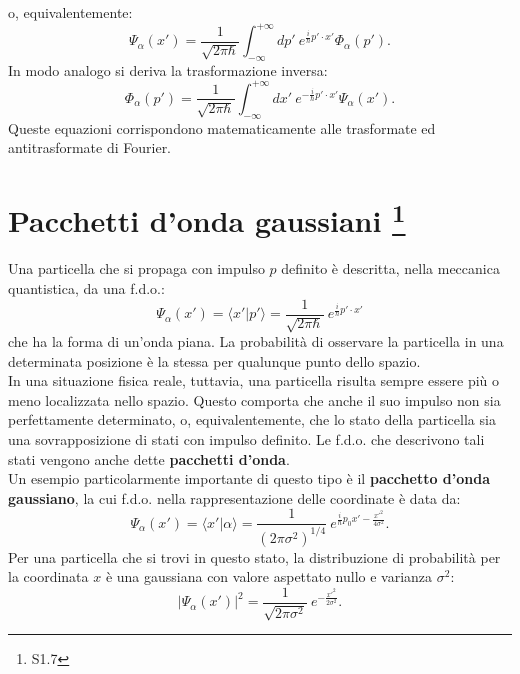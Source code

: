 \documentclass[a4paper,12pt,oneside]{book}
\begin{document}
o, equivalentemente:
\begin{equation}
\Psi_\alpha (x') = \frac{1}{\sqrt{2 \pi \hbar}} \int_{-\infty}^{+\infty} dp' ~ e^{\frac{i}{\hbar}p' \cdot x'} \Phi_\alpha (p').
\end{equation}
In modo analogo si deriva la trasformazione inversa:
\begin{equation}
\Phi_\alpha (p') = \frac{1}{\sqrt{2 \pi \hbar}} \int_{-\infty}^{+\infty} dx' ~ e^{-\frac{i}{\hbar}p' \cdot x'} \Psi_\alpha (x').
\end{equation}
Queste equazioni corrispondono matematicamente alle trasformate ed antitrasformate di Fourier.
\section[Pacchetti d'onda gaussiani]{Pacchetti d'onda gaussiani \footnote{S1.7}}
Una particella che si propaga con impulso $p$ definito è descritta, nella meccanica quantistica, da una f.d.o.:
\begin{equation}
\Psi_\alpha (x') = \langle x' | p' \rangle = \frac{1}{\sqrt{2 \pi \hbar}}~  e^{\frac{i}{\hbar}p' \cdot x'}
\end{equation}
che ha la forma di un'onda piana. La probabilità di osservare la particella in una determinata posizione è la stessa per qualunque punto dello spazio.\\
In una situazione fisica reale, tuttavia, una particella risulta sempre essere più o meno localizzata nello spazio. Questo comporta che anche il suo impulso non sia perfettamente determinato, o, equivalentemente, che lo stato della particella sia una sovrapposizione di stati con impulso definito. Le f.d.o. che descrivono tali stati vengono anche dette \textbf{pacchetti d'onda}.\\
Un esempio particolarmente importante di questo tipo è il \textbf{pacchetto d'onda gaussiano}, la cui f.d.o. nella rappresentazione delle coordinate è data da:
\begin{equation}
\Psi_\alpha (x') = \langle x' | \alpha \rangle = \frac{1}{(2 \pi \sigma^2)^{1/4}}~  e^{\frac{i}{\hbar}p_0 x' - \frac{x'^2}{4 \sigma^2}}.
\end{equation}
Per una particella che si trovi in questo stato, la distribuzione di probabilità per la coordinata $x$ è una gaussiana con valore aspettato nullo e varianza $\sigma^2$:
\begin{equation}
|\Psi_\alpha (x')|^2 = \frac{1}{\sqrt{2 \pi \sigma^2}}~   e^{- \frac{x'^2}{2 \sigma^2}}.
\end{equation}
\end{document}
